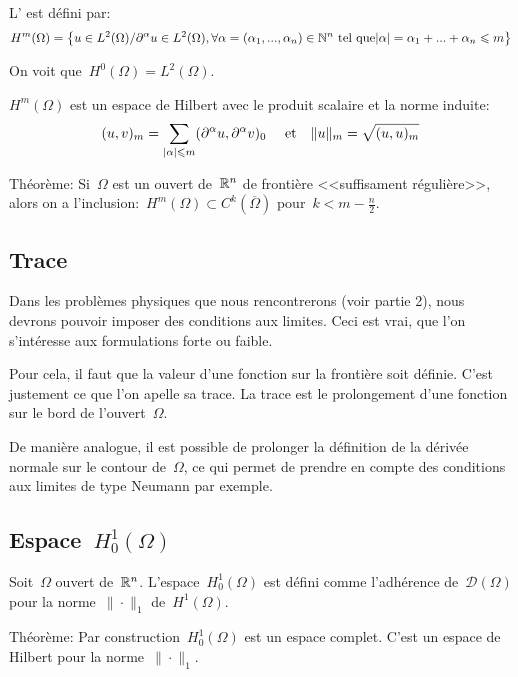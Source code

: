 L' est défini par:
\[
H^m(\Omega)=\left\{u\in L^2(\Omega)/ \partial^\alpha u\in L^2(\Omega),
\forall\alpha=(\alpha_1, ..., \alpha_n)\in\mathbb N^n \text{ tel que}|\alpha|=\alpha_1+...+\alpha_n\leqslant m
\right\}
\]

On voit que~$H^0(\Omega)=L^2(\Omega)$.

\medskip
$H^m(\Omega)$ est un espace de Hilbert avec le produit scalaire et la norme induite:
\[
(u,v)_m=\displaystyle\sum_{|\alpha|\leqslant m}(\partial^\alpha u,\partial^\alpha v)_0 
\quad \text{ et} \quad
\|u\|_m=\sqrt{(u,u)_m}
\]

Théorème: Si~$\Omega$ est un ouvert de~$\mathbb R^n$ de frontière <<suffisament
régulière>>, alors on a l'inclusion:~$H^m(\Omega)\subset C^k(\overline{\Omega})$
pour~$k<m-\frac{n}2$.

\medskip
\subsection*{Trace}

Dans les problèmes physiques que nous rencontrerons (voir partie 2), nous devrons
pouvoir imposer des conditions aux limites.
Ceci est vrai, que l'on s'intéresse aux formulations forte ou faible.

Pour cela, il faut que la valeur d'une fonction sur la frontière soit définie.
C'est justement ce que l'on apelle sa trace. 
La trace est le prolongement d'une fonction sur le bord de l'ouvert~$\Omega$.

De manière analogue, il est possible de prolonger la définition de la dérivée normale
sur le contour de~$\Omega$, ce qui permet de prendre en compte des conditions
aux limites de type Neumann par exemple.


\medskip
\subsection*{Espace~$H^1_0(\Omega)$}

Soit~$\Omega$ ouvert de~$\mathbb R^n$. 
L'espace~$H^1_0(\Omega)$ est défini comme l'adhérence de~$\mathcal{D}(\Omega)$
pour la norme~$\|\cdot\|_ 1$ de~$H^1(\Omega)$.

\medskip
Théorème: Par construction~$H^1_0(\Omega)$ est un espace complet. 
C'est un espace de Hilbert pour la norme~$\|\cdot\|_ 1$.


